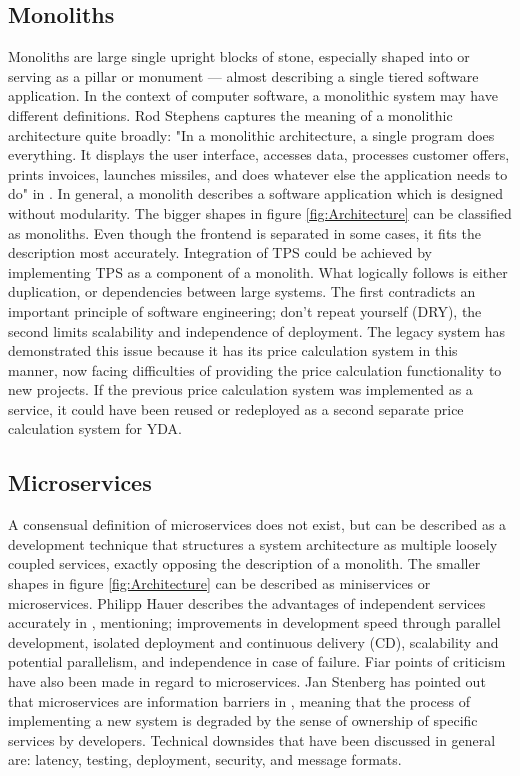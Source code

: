 \subsection{Monoliths}
Monoliths are large single upright blocks of stone, especially shaped into or serving as a pillar or monument --- almost describing a single tiered software application. In the context of computer software, a monolithic system may have different definitions. Rod Stephens captures the meaning of a monolithic architecture quite broadly: "In a monolithic architecture, a single program does everything. It displays the user interface, accesses data, processes customer offers, prints invoices, launches missiles, and does whatever else the application needs to do" in \cite{rod-BSE}. In general, a monolith describes a software application which is designed without modularity. The bigger shapes in figure \ref{fig:Architecture} can be classified as monoliths. Even though the frontend is separated in some cases, it fits the description most accurately. Integration of TPS could be achieved by implementing TPS as a component of a monolith. What logically follows is either duplication, or dependencies between large systems. The first contradicts an important principle of software engineering; don't repeat yourself (DRY), the second limits scalability and independence of deployment. The legacy system has demonstrated this issue because it has its price calculation system in this manner, now facing difficulties of providing the price calculation functionality to new projects. If the previous price calculation system was implemented as a service, it could have been reused or redeployed as a second separate price calculation system for YDA.

\subsection{Microservices}
A consensual definition of microservices does not exist, but can be described as a development technique that structures a system architecture as multiple loosely coupled services, exactly opposing the description of a monolith. The smaller shapes in figure \ref{fig:Architecture} can be described as miniservices or microservices. Philipp Hauer describes the advantages of independent services accurately in \cite{microservices}, mentioning; improvements in development speed through parallel development, isolated deployment and continuous delivery (CD), scalability and potential parallelism, and independence in case of failure. Fiar points of criticism have also been made in regard to microservices. Jan Stenberg has pointed out that microservices are information barriers in \cite{JS-microservices}, meaning that the process of implementing a new system is degraded by the sense of ownership of specific services by developers. Technical downsides that have been discussed in general are: latency, testing, deployment, security, and message formats.

